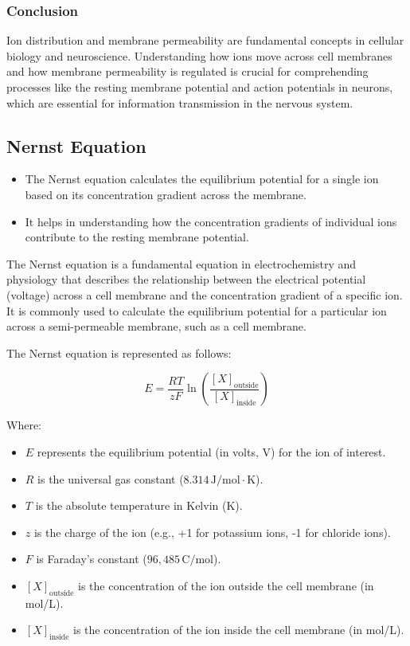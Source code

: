 \documentclass{article}
\begin{document}
\subsubsection{Conclusion}

Ion distribution and membrane permeability are fundamental concepts in cellular biology and neuroscience. Understanding how ions move across cell membranes and how membrane permeability is regulated is crucial for comprehending processes like the resting membrane potential and action potentials in neurons, which are essential for information transmission in the nervous system.



\subsection{Nernst Equation}
\begin{itemize}
    \item The Nernst equation calculates the equilibrium potential for a single ion based on its concentration gradient across the membrane.
    \item It helps in understanding how the concentration gradients of individual ions contribute to the resting membrane potential.
\end{itemize}
The Nernst equation is a fundamental equation in electrochemistry and physiology that describes the relationship between the electrical potential (voltage) across a cell membrane and the concentration gradient of a specific ion. It is commonly used to calculate the equilibrium potential for a particular ion across a semi-permeable membrane, such as a cell membrane.

The Nernst equation is represented as follows:

\[
E = \frac{RT}{zF} \ln\left(\frac{[X]_{\text{outside}}}{[X]_{\text{inside}}}\right)
\]

Where:
\begin{itemize}
  \item \(E\) represents the equilibrium potential (in volts, V) for the ion of interest.
  \item \(R\) is the universal gas constant (\(8.314 \, \text{J/mol} \cdot \text{K}\)).
  \item \(T\) is the absolute temperature in Kelvin (K).
  \item \(z\) is the charge of the ion (e.g., +1 for potassium ions, -1 for chloride ions).
  \item \(F\) is Faraday's constant (\(96,485 \, \text{C/mol}\)).
  \item \([X]_{\text{outside}}\) is the concentration of the ion outside the cell membrane (in mol/L).
  \item \([X]_{\text{inside}}\) is the concentration of the ion inside the cell membrane (in mol/L).
\end{itemize}
\end{document}
